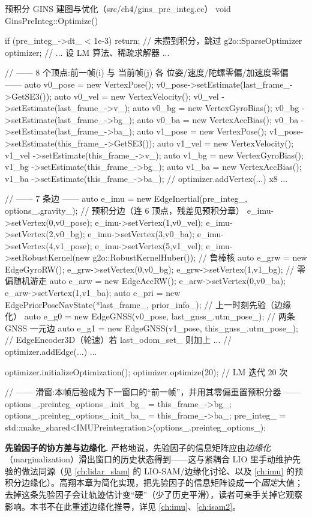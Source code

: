 \begin{codebox}[C++]{预积分 GINS 建图与优化（src/ch4/gins\_pre\_integ.cc）}
void GinsPreInteg::Optimize() {
  if (pre_integ_->dt_ < 1e-3) return;            // 未攒到积分，跳过
  g2o::SparseOptimizer optimizer;
  // ... 设 LM 算法、稀疏求解器 ...

  // —— 8 个顶点:前一帧(i) 与 当前帧(j) 各 位姿/速度/陀螺零偏/加速度零偏 ——
  auto v0_pose = new VertexPose();     v0_pose->setEstimate(last_frame_->GetSE3());
  auto v0_vel  = new VertexVelocity(); v0_vel ->setEstimate(last_frame_->v_);
  auto v0_bg   = new VertexGyroBias(); v0_bg  ->setEstimate(last_frame_->bg_);
  auto v0_ba   = new VertexAccBias();  v0_ba  ->setEstimate(last_frame_->ba_);
  auto v1_pose = new VertexPose();     v1_pose->setEstimate(this_frame_->GetSE3());
  auto v1_vel  = new VertexVelocity(); v1_vel ->setEstimate(this_frame_->v_);
  auto v1_bg   = new VertexGyroBias(); v1_bg  ->setEstimate(this_frame_->bg_);
  auto v1_ba   = new VertexAccBias();  v1_ba  ->setEstimate(this_frame_->ba_);
  // optimizer.addVertex(...) x8 ...

  // —— 7 条边 ——
  auto e_imu = new EdgeInertial(pre_integ_, options_.gravity_);   // 预积分边（连 6 顶点，残差见预积分章）
  e_imu->setVertex(0,v0_pose); e_imu->setVertex(1,v0_vel); e_imu->setVertex(2,v0_bg);
  e_imu->setVertex(3,v0_ba);   e_imu->setVertex(4,v1_pose); e_imu->setVertex(5,v1_vel);
  e_imu->setRobustKernel(new g2o::RobustKernelHuber());          // 鲁棒核
  auto e_grw = new EdgeGyroRW(); e_grw->setVertex(0,v0_bg); e_grw->setVertex(1,v1_bg); // 零偏随机游走
  auto e_arw = new EdgeAccRW();  e_arw->setVertex(0,v0_ba); e_arw->setVertex(1,v1_ba);
  auto e_pri = new EdgePriorPoseNavState(*last_frame_, prior_info_);                   // 上一时刻先验（边缘化）
  auto e_g0  = new EdgeGNSS(v0_pose, last_gnss_.utm_pose_);       // 两条 GNSS 一元边
  auto e_g1  = new EdgeGNSS(v1_pose, this_gnss_.utm_pose_);
  // EdgeEncoder3D（轮速）若 last_odom_set_ 则加上 ...
  // optimizer.addEdge(...) ...

  optimizer.initializeOptimization(); optimizer.optimize(20);    // LM 迭代 20 次

  // —— 滑窗:本帧后验成为下一窗口的“前一帧”，并用其零偏重置预积分器 ——
  options_.preinteg_options_.init_bg_ = this_frame_->bg_;
  options_.preinteg_options_.init_ba_ = this_frame_->ba_;
  pre_integ_ = std::make_shared<IMUPreintegration>(options_.preinteg_options_);
}
\end{codebox}

\begin{note}
\textbf{先验因子的协方差与边缘化.}\;
严格地说，先验因子的信息矩阵应由\emph{边缘化}（marginalization）滑出窗口的历史状态得到——这与紧耦合 LIO 里手动维护先验的做法同源（见 \cref{ch:lidar_slam} 的 LIO-SAM/边缘化讨论、以及 \cref{ch:imu} 的预积分边缘化）。高翔本章为简化实现，把先验因子的信息矩阵设成一个\emph{固定}大值；去掉这条先验因子会让轨迹估计变“硬”（少了历史平滑），读者可亲手关掉它观察影响\cite{gao2023slamad}。本书不在此重述边缘化推导，详见 \cref{ch:imu}、\cref{ch:isam2}。
\end{note}

